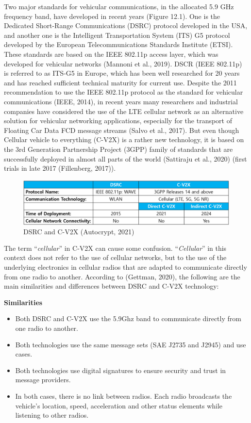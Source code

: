 \documentclass[
]{book}
\providecommand{\tightlist}{%
  \setlength{\itemsep}{0pt}\setlength{\parskip}{0pt}}
\begin{document}
Two major standards for vehicular communications, in the allocated 5.9 GHz frequency band, have developed in recent years (Figure 12.1). One is the Dedicated Short-Range Communications (DSRC) protocol developed in the USA, and another one is the Intelligent Transportation System (ITS) G5 protocol developed by the European Telecommunications Standards Institute (ETSI). These standards are based on the IEEE 802.11p access layer, which was developed for vehicular networks (Mannoni et al., 2019). DSCR (IEEE 802.11p) is referred to as ITS-G5 in Europe, which has been well researched for 20 years and has reached sufficient technical maturity for current use. Despite the 2011 recommendation to use the IEEE 802.11p protocol as the standard for vehicular communications (IEEE, 2014), in recent years many researchers and industrial companies have considered the use of the LTE cellular network as an alternative solution for vehicular networking applications, especially for the transport of Floating Car Data FCD message streams (Salvo et al., 2017). But even though Cellular vehicle to everything (C-V2X) is a rather new technology, it is based on the 3rd Generation Partnership Project (3GPP) family of standards that are successfully deployed in almost all parts of the world (Sattiraju et al., 2020) (first trials in late 2017 (Fillenberg, 2017)).

\begin{figure}
\includegraphics[width=0.6\linewidth]{image/DSRC} \caption{DSRC and C-V2X (Autocrypt, 2021)}\label{fig:unnamed-chunk-15}
\end{figure}

The term ``\emph{cellular}'' in C-V2X can cause some confusion. ``\emph{Cellular}'' in this context does not refer to the use of cellular networks, but to the use of the underlying electronics in cellular radios that are adapted to communicate directly from one radio to another. According to (Gettman, 2020), the following are the main similarities and differences between DSRC and C-V2X technology:

\textbf{Similarities}

\begin{itemize}
\tightlist
\item
  Both DSRC and C-V2X use the 5.9Ghz band to communicate directly from one radio to another.
\item
  Both technologies use the same message sets (SAE J2735 and J2945) and use cases.
\item
  Both technologies use digital signatures to ensure security and trust in message providers.
\item
  In both cases, there is no link between radios. Each radio broadcasts the vehicle's location, speed, acceleration and other status elements while listening to other radios.
\end{itemize}
\end{document}
